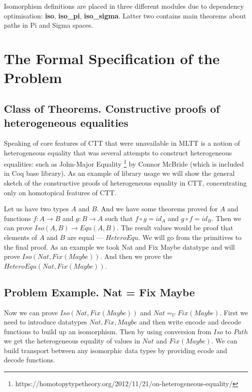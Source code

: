 \documentclass{article}
\begin{document}
Isomorphism definitions are placed in three different modules due to dependency
optimisation: {\bf iso}, {\bf iso\_pi}, {\bf iso\_sigma}. Latter two contains
main theorems about paths in Pi and Sigma spaces.

\section{The Formal Specification of the Problem}

\subsection{Class of Theorems. Constructive proofs of heterogeneous equalities}

Speaking of core features of CTT that were unavailable in MLTT is a notion
of heterogeneous equality that was several attempts to construct heterogeneous equalities:
such as John-Major Equality \footnote{https://homotopytypetheory.org/2012/11/21/on-heterogeneous-equality/}
by Connor McBride (which is included in Coq base library). As an example of library usage
we will show the general sketch of the constructive proofs of heterogeneous equality in CTT,
concentrating only on homotopical features of CTT.

Let us have two types $A$ and $B$. And we have some theorems proved for $A$ and functions
$f: A \rightarrow B$ and $g: B \rightarrow A$ such that $f \circ g = id_A$ and $g \circ f = id_B$. Then we
can prove $Iso(A,B) \rightarrow Equ(A,B)$. The result values would be proof that
elements of $A$ and $B$ are equal --- $HeteroEqu$. We will go from the primitives to the final proof.
As an example we took Nat and Fix Maybe datatype and will prove $Iso(Nat,Fix(Maybe))$.
And then we prove the $HeteroEqu(Nat,Fix(Maybe))$.

\subsection{Problem Example. Nat = Fix Maybe}

Now we can prove $Iso(Nat, Fix(Maybe))$ and $Nat =_U Fix(Maybe)$.
First we need to introduce datatypes $Nat, Fix, Maybe$ and then write encode and decode
functions to build up an isomorphism. Then by using conversion
from $Iso$ to $Path$ we get the heterogeneous equality of values in $Nat$ and $Fix(Maybe)$.
We can build transport between any isomorphic data types by providing ecode and decode functions.
\end{document}
